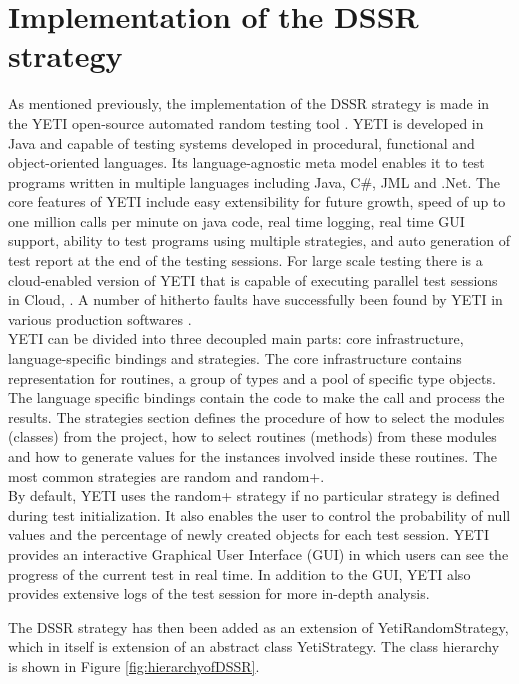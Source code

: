 \documentclass[conference]{IEEEtran}
\begin{document}
\section{Implementation of the DSSR strategy}\label{sec:imp}
As mentioned previously, the implementation of the DSSR strategy is made in the YETI open-source automated random testing tool \cite{Oriol2011, Oriol2012}. YETI is developed in Java and capable of testing systems developed in procedural, functional and object-oriented languages. Its language-agnostic meta model enables it to test programs written in multiple languages including Java, C\#, JML and .Net. The core features of YETI include easy extensibility for future growth, speed of up to one million calls per minute on java code, real time logging, real time GUI support, ability to test programs using multiple strategies, and auto generation of test report at the end of the testing sessions. For large scale testing there is a cloud-enabled version of YETI that is capable of executing parallel test sessions in Cloud, \cite{Oriol2010}. A number of hitherto faults have successfully been found by YETI in various production softwares \cite{Oriol2011, Oriol2012}. \\
\indent YETI can be divided into three decoupled main parts: core infrastructure, language-specific bindings and strategies. The core infrastructure contains representation for routines, a group of types and a pool of specific type objects. The language specific bindings contain the code to make the call and process the results. The strategies section defines the procedure of how to select the modules (classes) from the project, how to select routines (methods) from these modules and how to generate values for the instances involved inside these routines. The most common strategies are random and random+. \\
\indent By default, YETI uses the random+ strategy if no particular strategy is defined during test initialization. It also enables the user to control the probability of null values and the percentage of newly created objects for each test session. YETI provides an interactive Graphical User Interface (GUI) in which users can see the progress of the current test in real time. In addition to the GUI, YETI also provides extensive logs of the test session for more in-depth analysis.

\indent The DSSR strategy has then been added as an extension of YetiRandomStrategy, which in itself is extension of an abstract class YetiStrategy. The class hierarchy is shown in Figure \ref{fig:hierarchyofDSSR}.
\end{document}
